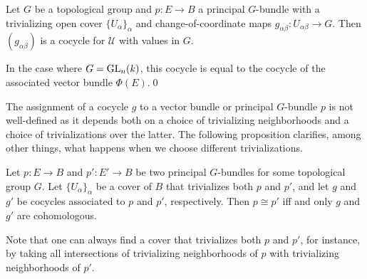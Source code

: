 \documentclass[a4paper,openany]{scrbook}
\begin{document}
\begin{lemma}\label{lemma:principalbundlegivescocycle}
Let $G$ be a topological group and $p\colon E \to B$ a principal $G$-bundle with a trivializing open cover $\{U_\alpha\}_{\alpha}$ and change-of-coordinate maps $g_{\alpha\beta}\colon U_{\alpha\beta} \to G$. Then $(g_{\alpha\beta})$ is a cocycle for $\mathcal U$ with values in $G$.

In the case where $G=\operatorname{GL}_n(k)$, this cocycle is equal to the cocycle of the associated vector bundle $\Phi(E)$.\qed
\end{lemma}

\bigskip

The assignment of a cocycle $g$ to a vector bundle or principal $G$-bundle $p$ is not well-defined as it depends both on a choice of trivializing neighborhoods and a choice of trivializations over the latter. The following proposition clarifies, among other things, what happens when we choose different trivializations.

\begin{prop}\label{prop:cocycleisomorphisms}
Let $p\colon E \to B$ and $p'\colon E' \to B$ be two principal $G$-bundles for some topological group $G$. Let $\{U_\alpha\}_\alpha$ be a cover of $B$ that trivializes both $p$ and $p'$, and let $g$ and $g'$ be cocycles associated to $p$ and $p'$, respectively. Then $p \cong p'$ iff and only $g$ and $g'$ are cohomologous.
\end{prop}
Note that one can always find a cover that trivializes both $p$ and $p'$, for instance, by taking all intersections of trivializing neighborhoods of $p$ with trivializing neighborhoods of $p'$.
\end{document}
